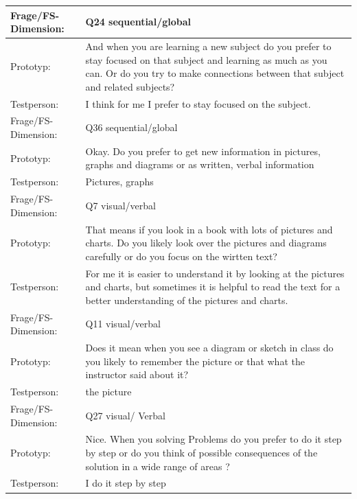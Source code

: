 \begin{longtable}{|m{2.5cm}|m{12.0cm}|}
Frage/FS-Dimension: & Q24 sequential/global \\ \hline   
\hline

Prototyp: & And when you are learning a new subject do you prefer to stay focused on that subject and learning as much as you can. Or 
          do you try to make connections between that subject and related subjects?   \\  \hline  
Testperson: & I think for me I prefer to stay focused on the subject. \\ \hline
 

Frage/FS-Dimension: & Q36 sequential/global \\ \hline   
\hline

Prototyp: & Okay. Do you prefer to get new information in pictures, graphs and diagrams or as written, verbal information   \\  \hline  
Testperson: &Pictures, graphs \\ \hline
 

Frage/FS-Dimension: & Q7 visual/verbal \\ \hline   
\hline

Prototyp: & That means if you look in a book with lots of pictures and charts. Do you likely look over the pictures and diagrams 
carefully or do you focus on the wirtten text? \\  \hline  
Testperson: & For me it is easier to understand it by looking at the pictures and charts,
 but sometimes it is helpful to read the text for a better understanding of the pictures and charts.\\ \hline
  

 Frage/FS-Dimension: & Q11 visual/verbal \\ \hline   
\hline

Prototyp: & Does it mean when you see a diagram or sketch in class do you likely to remember the picture or that what the 
        instructor said about it?\\  \hline  
Testperson: & the picture\\ \hline
 

Frage/FS-Dimension: & Q27 visual/ Verbal \\ \hline   
\hline

Prototyp: & Nice. When you solving Problems do you prefer to do it step by step or do you think of possible consequences 
              of the solution in a wide range of areas ?\\  \hline  
Testperson: &I do it step by step \\ \hline
 


\end{longtable}
